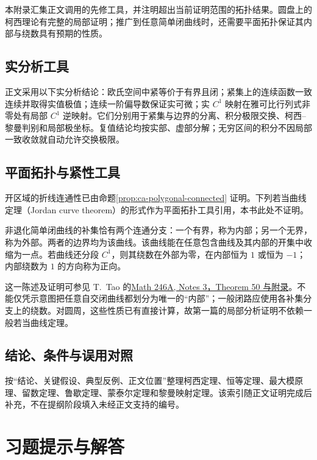 \documentclass[UTF8,12pt,a4paper,fontset=fandol]{ctexbook}
\begin{document}
本附录汇集正文调用的先修工具，并注明超出当前证明范围的拓扑结果。圆盘上的柯西理论有完整的局部证明；推广到任意简单闭曲线时，还需要平面拓扑保证其内部与绕数具有预期的性质。

\section{实分析工具}
正文采用以下实分析结论：欧氏空间中紧等价于有界且闭；紧集上的连续函数一致连续并取得实值极值；连续一阶偏导数保证实可微；实 $C^1$ 映射在雅可比行列式非零处有局部 $C^1$ 逆映射。它们分别用于紧集与边界的分离、积分极限交换、柯西--黎曼判别和局部极坐标。复值结论均按实部、虚部分解；无穷区间的积分不因局部一致收敛就自动允许交换极限。

\section{平面拓扑与紧性工具}
\label{sec:ca-jordan-tool}
开区域的折线连通性已由命题\ref{prop:ca-polygonal-connected} 证明。下列若当曲线定理（Jordan curve theorem）的形式作为平面拓扑工具引用，本书此处不证明。

\begin{theorem}[简单闭曲线的内外区域]
非退化简单闭曲线的补集恰有两个连通分支：一个有界，称为内部；另一个无界，称为外部。两者的边界均为该曲线。该曲线能在任意包含曲线及其内部的开集中收缩为一点。若曲线还分段 $C^1$，则其绕数在外部为零，在内部恒为 $1$ 或恒为 $-1$；内部绕数为 $1$ 的方向称为正向。
\end{theorem}

这一陈述及证明可参见 T.~Tao 的\href{https://terrytao.wordpress.com/2016/10/02/math-246a-notes-3-cauchys-theorem-and-its-consequences/}{Math 246A, Notes 3，Theorem 50 与附录}。不能仅凭示意图把任意自交闭曲线都划分为唯一的“内部”；一般闭路应使用各补集分支上的绕数。对圆周，这些性质已有直接计算，故第一篇的局部分析证明不依赖一般若当曲线定理。

\section{结论、条件与误用对照}
按“结论、关键假设、典型反例、正文位置”整理柯西定理、恒等定理、最大模原理、留数定理、鲁歇定理、蒙泰尔定理和黎曼映射定理。该索引随正文证明完成后补充，不在提纲阶段填入未经正文支持的编号。

\chapter{习题提示与解答}
\label{chap:ca-solutions}
\end{document}
